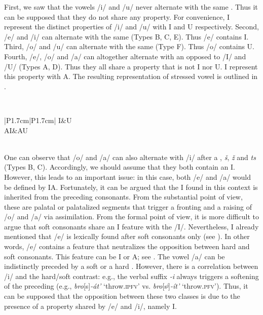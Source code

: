\documentclass[output=paper,modfonts,newtxmath,hidelinks,]{langscibook}
\begin{document}
First, we saw that the vowels /i/ and /u/ never alternate with the same . Thus it can be supposed that they do not share any property. For convenience, I represent the distinct properties of /i/ and /u/ with {\textbar}I{\textbar} and {\textbar}U{\textbar} respectively. Second, /e/ and /i/ can alternate with the same  (Types B, C, E). Thus /e/ contains {\textbar}I{\textbar}. Third, /o/ and /u/ can alternate with the same  (Type F). Thus /o/ contains {\textbar}U{\textbar}. Fourth, /e/, /o/ and /a/ can altogether alternate with an  opposed to /I/ and /U/ (Types A, D). Thus they all share a property that is not {\textbar}I{\textbar} nor {\textbar}U{\textbar}. I represent this property with {\textbar}A{\textbar}. The resulting representation of stressed vowel is outlined in .

\label{5:19}\\\medskip
\begin{tabular}{|P{1.7cm}|P{1.7cm}|}
\hline
\textbar I\textbar&\textbar U\textbar\\\hline
\textbar AI\textbar&\textbar AU\textbar\\\hline
{}\\\hline
\end{tabular}
\z

\noindent One can observe that /o/ and /a/ can also alternate with /i/ after a , \textit{š}, \textit{ž} and \textit{ts} (Types B, C). Accordingly, we should assume that they both contain an {\textbar}I{\textbar}. However, this leads to an important issue: in this case, both /e/ and /a/ would be defined by {\textbar}IA{\textbar}. Fortunately, it can be argued that the {\textbar}I{\textbar} found in this context is inherited from the preceding consonants. From the substantial point of view, these are palatal or palatalized segments that trigger a fronting and a raising of /o/ and /a/ via assimilation. From the formal point of view, it is more difficult to argue that soft consonants share an {\textbar}I{\textbar} feature with the  /I/. Nevertheless, I already mentioned that /e/ is lexically found after soft consonants only (see ). In other words, /e/ contains a feature that neutralizes the opposition between hard and soft consonants. This feature can be {\textbar}I{\textbar} or {\textbar}A{\textbar}; see . The vowel /a/ can be indistinctly preceded by a soft or a hard . However, there is a correlation between /i/ and the hard/soft contrast: e.g., the verbal suffix \textit{-i} always triggers a softening of the preceding  (e.g., \textit{bro}[s]\textit{{}-}\textit{át’} `throw.\textsc{ipfv}' vs. \textit{bro}[sʲ]\textit{{}-}\textit{ít’} ‘throw.\textsc{pfv}’). Thus, it can be supposed that the opposition between these two  classes is due to the presence of a property shared by /e/ and /i/, namely {\textbar}I{\textbar}.
\end{document}
